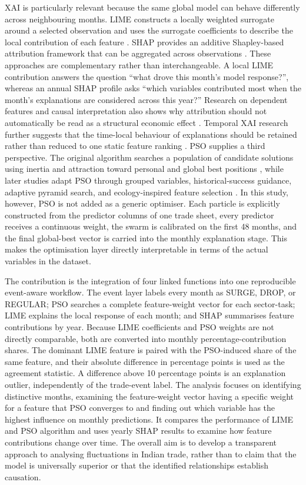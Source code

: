 \documentclass[pdftex,sn-mathphys-num]{sn-jnl}
\begin{document}
XAI is particularly relevant because the same global model can behave differently across neighbouring months. LIME constructs a locally weighted surrogate around a selected observation and uses the surrogate coefficients to describe the local contribution of each feature \cite{ribeiro2016}. SHAP provides an additive Shapley-based attribution framework that can be aggregated across observations \cite{lundberg2017}. These approaches are complementary rather than interchangeable. A local LIME contribution answers the question ``what drove this month's model response?'', whereas an annual SHAP profile asks ``which variables contributed most when the month's explanations are considered across this year?'' Research on dependent features and causal interpretation also shows why attribution should not automatically be read as a structural economic effect \cite{aas2021,janzing2020}. Temporal XAI research further suggests that the time-local behaviour of explanations should be retained rather than reduced to one static feature ranking \cite{canti2024,vanzy2024,hertel2026}. PSO supplies a third perspective. The original algorithm searches a population of candidate solutions using inertia and attraction toward personal and global best positions \cite{kennedy1995,shi1998,clerc2002,poli2007}, while later studies adapt PSO through grouped variables, historical-success guidance, adaptive pyramid search, and ecology-inspired feature selection \cite{gao2024,gupta2024,jin2024,pepspso2025}. In this study, however, PSO is not added as a generic optimiser. Each particle is explicitly constructed from the predictor columns of one trade sheet, every predictor receives a continuous weight, the swarm is calibrated on the first 48 months, and the final global-best vector is carried into the monthly explanation stage. This makes the optimisation layer directly interpretable in terms of the actual variables in the dataset.

The contribution is the integration of four linked functions into one reproducible event-aware workflow. The event layer labels every month as SURGE, DROP, or REGULAR; PSO searches a complete feature-weight vector for each sector-task; LIME explains the local response of each month; and SHAP summarises feature contributions by year. Because LIME coefficients and PSO weights are not directly comparable, both are converted into monthly percentage-contribution shares. The dominant LIME feature is paired with the PSO-induced share of the same feature, and their absolute difference in percentage points is used as the agreement statistic. A difference above 10 percentage points is an explanation outlier, independently of the trade-event label. The analysis focuses on identifying distinctive months, examining the feature-weight vector having a specific weight for a feature that PSO converges to and finding out which variable has the highest influence on monthly predictions. It compares the performance of LIME and PSO algorithm and uses yearly SHAP results to examine how feature contributions change over time. The overall aim is to develop a transparent approach to analysing fluctuations in Indian trade, rather than to claim that the model is universally superior or that the identified relationships establish causation.
\end{document}
